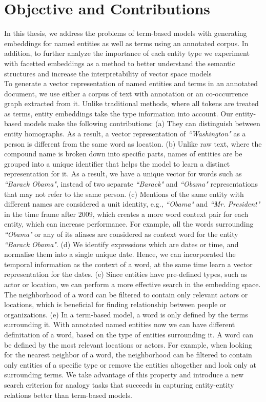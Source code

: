 \section{Objective and Contributions}
In this thesis, we address the problems of term-based models with generating embeddings for named entities as well as terms using an annotated corpus. In addition, to further analyze the importance of each entity type we experiment with facetted embeddings as a method to better understand the semantic structures and increase the interpretability of vector space models\\
To generate a vector representation of named entities and terms in an annotated document, we use either a corpus of text with annotation or an co-occurrence graph extracted from it. Unlike traditional methods, where all tokens are treated as terms, entity embeddings take the type information into account. Our entity-based models make the following contributions: (a) They can distinguish between entity homographs. As a result, a vector representation of \emph{``Washington"} as a person is different from the same word as location. (b) Unlike raw text, where the compound name is broken down into specific parts, names of entities are be grouped into a unique identifier that helps the model to learn a distinct representation for it. As a result, we have a unique vector for words such as  \emph{``Barack Obama"}, instead of two separate \emph{``Barack"} and \emph{``Obama"} representations that may not refer to the same person. (c) Mentions of the same entity with different names are considered a unit identity, e.g., \emph{``Obama"} and \emph{``Mr. President"} in the time frame after $2009$, which creates a more word context pair for each entity, which can increase performance. For example, all the words surrounding \emph{``Obama"} or any of its aliases are considered as context word for the entity \emph{``Barack Obama"}. (d) We identify expressions which are dates or time, and normalise them into a single unique date. Hence, we can incorporated the temporal information as the context of a word, at the same time learn a vector representation for the dates. (e) Since entities have pre-defined types, such as actor or location, we can perform a more effective search in the embedding space. The neighborhood of a word can be filtered to contain only relevant actors or locations, which is beneficial for finding relationship between people or organizations. (e) In a term-based model, a word is only defined by the terms surrounding it. With annotated named entities now we can have different definitation of a word, based on the type of entities surrounding it. A word can be defined by the most relevant locations or actors. For example, when looking for the nearest neighbor of a word, the neighborhood can be filtered to contain only entities of a specific type or remove the entities altogether and look only at surrounding terms. We take advantage of this property and introduce a new search criterion for analogy tasks that succeeds in capturing entity-entity relations better than term-based models. \\
